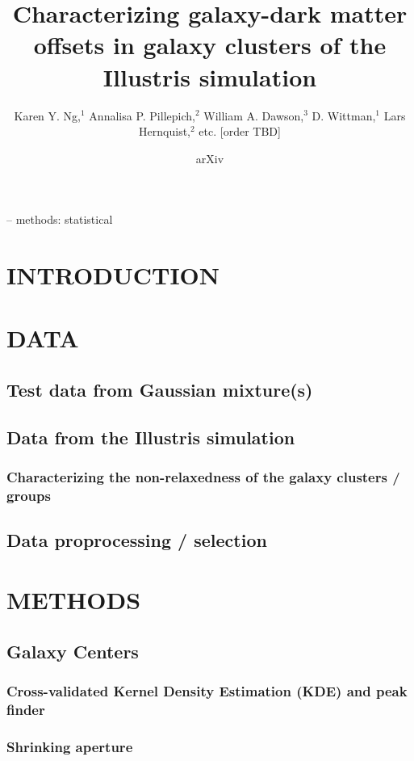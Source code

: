 \documentclass[letterpaper,useAMS,usenatbib]{mn2e}
\title[
	Characterizing galaxy-dark matter offsets in galaxy clusters of the
Illustris simulation
]
{Characterizing galaxy-dark matter offsets in galaxy clusters of the
Illustris simulation}
\author[Karen Y. Ng et al.]{Karen Y. Ng,$^{1}$
	Annalisa P. Pillepich,$^{2}$ 
	William A. Dawson,$^{3}$ 
	D. Wittman,$^{1}$
	\newauthor Lars Hernquist,$^{2}$
	etc. [order TBD]
}
\begin{document}
\date{arXiv} \pagerange{\pageref{firstpage}--\pageref{lastpage}}
 \maketitle\label{firstpage}
\begin{abstract} 
	
\end{abstract}
\begin{keywords}
-- methods: statistical 
\end{keywords}
\section{INTRODUCTION} 
\section{DATA}
\subsection{Test data from Gaussian mixture(s)}
\subsection{Data from the Illustris simulation} 
\subsubsection{Characterizing the non-relaxedness of the galaxy clusters /
groups}
\subsection{Data proprocessing / selection}
\section{METHODS} 
\subsection{Galaxy Centers}
\subsubsection{Cross-validated Kernel Density Estimation (KDE) and peak finder} 
\subsubsection{Shrinking aperture}
\end{document}
